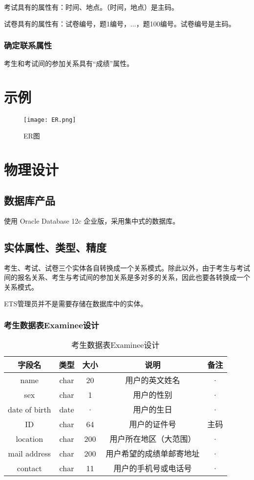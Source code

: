 考试具有的属性有：时间、地点。（时间，地点）是主码。

试卷具有的属性有：试卷编号，题1编号，...，题100编号。试卷编号是主码。

\subsubsection{确定联系属性}
考生和考试间的参加关系具有“成绩”属性。

\section{示例}
\begin{figure}[ht]
\centering
\texttt{[image: ER.png]}
\caption{ER图} \label{fig:figure1}
\end{figure}



\section{物理设计}

\subsection{数据库产品}
使用 Oracle Database 12c 企业版，采用集中式的数据库。

\subsection{实体属性、类型、精度}
考生、考试、试卷三个实体各自转换成一个关系模式。除此以外，由于考生与考试间的报名关系、考生与考试间的参加关系是多对多的关系，因此也要各转换成一个关系模式。

ETS管理员并不是需要存储在数据库中的实体。

\subsubsection{考生数据表Examinee设计}
\begin{table}[htbp]
\centering
\caption{考生数据表Examinee设计} \label{tab:client-database}
\begin{tabular}{|c|c|c|c|c|}
    \hline
    字段名 & 类型 & 大小 & 说明 & 备注 \\
    \hline
    name & char & 20 & 用户的英文姓名 & · \\
    \hline
    sex & char & 1 & 用户的性别 & · \\
    \hline
    date of birth & date & · & 用户的生日 & · \\
    \hline
    ID & char & 64 & 用户的证件号 & 主码 \\
    \hline
    location & char & 200 & 用户所在地区（大范围） & · \\
    \hline
    mail address & char & 200 & 用户希望的成绩单邮寄地址 & · \\
    \hline
    contact & char & 11 & 用户的手机号或电话号 & · \\
    \hline
\end{tabular}
\end{table}

